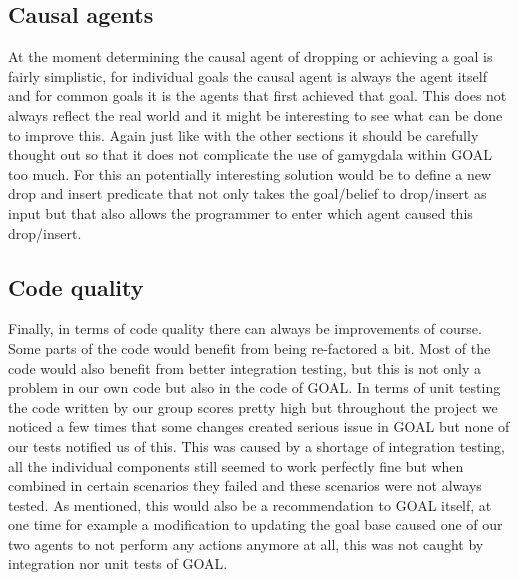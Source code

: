 \documentclass[11pt]{article}
\begin{document}
\subsection{Causal agents}
At the moment determining the causal agent of dropping or achieving a goal is fairly simplistic, for individual goals the causal agent is always the agent itself and for common goals it is the agents that first achieved that goal. This does not always reflect the real world and it might be interesting to see what can be done to improve this. Again just like with the other sections it should be carefully thought out so that it does not complicate the use of gamygdala within GOAL too much. For this an potentially interesting solution would be to define a new drop and insert predicate that not only takes the goal/belief to drop/insert as input but that also allows the programmer to enter which agent caused this drop/insert.

\subsection{Code quality}
Finally, in terms of code quality there can always be improvements of course. Some parts of the code would benefit from being re-factored a bit. Most of the code would also benefit from better integration testing, but this is not only a problem in our own code but also in the code of GOAL. In terms of unit testing the code written by our group scores pretty high but throughout the project we noticed a few times that some changes created serious issue in GOAL but none of our tests notified us of this. This was caused by a shortage of integration testing, all the individual components still seemed to work perfectly fine but when combined in certain scenarios they failed and these scenarios were not always tested. As mentioned, this would also be a recommendation to GOAL itself, at one time for example a modification to updating the goal base caused one of our two agents to not perform any actions anymore at all, this was not caught by integration nor unit tests of GOAL.

\clearpage
\printglossaries
\end{document}
